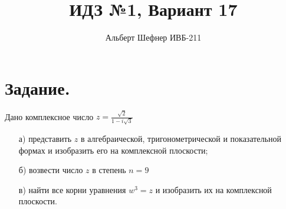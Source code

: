 \documentclass[12pt, a4paper]{article}
\title{ИДЗ №1, Вариант 17}
\author{Альберт Шефнер ИВБ-211}
\begin{document}
\maketitle 
\tableofcontents
%
%
\section{Задание.}
    Дано комплексное число
    \begin{math}
        z = \frac{\sqrt{2}}{1 - i\sqrt{3}}
    \end{math}
    \begin{enumerate}
        \item [а)] представить 
        \begin{math}
            z
        \end{math}
        в алгебраической, тригонометрической и показательной 
        формах и изобразить его на комплексной плоскости;
        \item [б)] возвести число $z$ в степень $n = 9$
        \item [в)] найти все корни уравнения
        \begin{math}
            w^3 = z
        \end{math}
        и изобразить их на комплексной плоскости.
    \end{enumerate}
\end{document}
